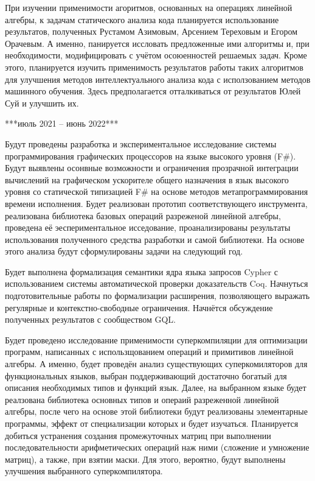 \documentclass[12pt]{article}  %
\theoremstyle{remark}
\begin{document}
При изучении применимости агоритмов, основанных на операциях линейной алгебры, к задачам статического анализа кода планируется использование результатов, полученных Рустамом Азимовым, Арсением Тереховым и Егором Орачевым. А именно, панируется иссловать предложенные ими алгоритмы и, при необходимости, модифицировать с учётом осоюенностей решаемых задач. Кроме этого, планируется изучить применимость результатов работы таких алгоритмов для улучшения методов интеллектуального анализа кода с исползованием методов машинного обучения. Здесь предполагается отталкиваться от результатов Юлей Суй и улучшить их.


***июль 2021 -- июнь 2022***

Будут проведены разработка и экспериментальное исследование системы программирования графических процессоров на языке высокого уровня (F\#). Будут выявлены осонвные возможности и ограничения прозрачной интеграции вычислений на графическом ускорителе общего назначения в язык высокого уровня со статической типизацией F\# на основе методов метапрограммирования времени исполнения. Будет реализован прототип соответствующего инструмента, реализована библиотека базовых операций разреженой линейной алгебры, проведена её эеспериментальное исседование, проанализированы результаты использования полученного средства разработки и самой библиотеки. На основе этого анализа будут сформулированы задачи на следующий год. 

Будет выполнена формализация семантики ядра языка запросов Cypher с использованием системы автоматической проверки доказательств Coq. Начнуться подготовительные работы по формализации расширения, позволяющего выражать регулярные и контекстно-свободные ограничения. Начнётся обсуждение полученных результатов с сообществом GQL.

Будет проведено исследование применимости суперкомпиляции для оптимизации программ, написанных с использщованием операций и примитивов линейной алгебры. А именно, будет проведён анализ существующих суперкомиляторов для функциональных языков, выбран поддерживающий достаточно богатый для описания необходимых типов и функций язык. Далее, на выбранном языке будет реалзована библиотека основных типов и операий разреженной линейной алгебры, после чего на основе этой библиотеки будут реализованы элементарные программы, эффект от специализации которых и будет изучаться. Планируется добиться устранения создания промежуточных матриц при выполнении последовательности арифметических операций наж ними (сложение и умножение матриц), а также, при взятии маски. Для этого, вероятно, будут выполнены улучшения выбранного суперкомпилятора.
\end{document}
